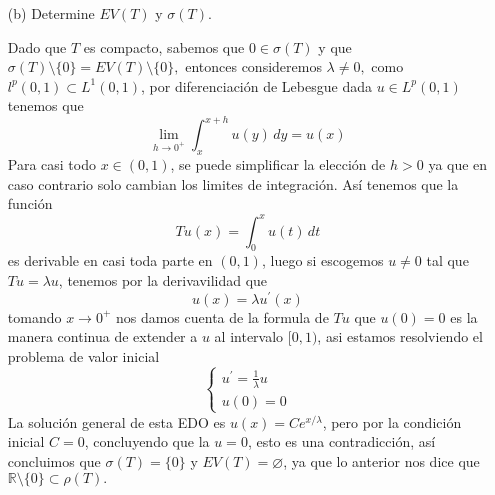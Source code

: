 \begin{itemize}
\begin{sproof}
    \end{sproof}
\item[(b)] Determine $E V(T)$ y $\sigma(T)$.
    \begin{sproof}
        Dado que $T$ es compacto, sabemos que $0\in \sigma(T)$ y que $\sigma(T)\setminus \{0\}=EV(T)\setminus\{0\},$ entonces consideremos $\lambda\neq 0,$ como $l^p(0,1)\subset L^1(0,1)$, por diferenciación  de Lebesgue dada $u\in L^p(0,1)$ tenemos que
        $$\lim_{h\to 0^+}\int_x^{x+h}u(y)\,dy=u(x)$$
        Para casi todo $x\in(0,1)$, se puede simplificar la elección de $h>0$ ya que en caso contrario solo cambian los limites de integración. Así tenemos que la función
        $$Tu(x)=\int_0^xu(t)\,dt$$
        es derivable en casi toda parte en $(0,1)$, luego si escogemos $u\neq 0$ tal que $Tu=\lambda u$, tenemos por la derivavilidad que
        $$u(x)=\lambda u^\prime(x)$$
        tomando $x\to 0^+$ nos damos cuenta de la formula de $Tu$ que $u(0)=0$ es la manera continua de extender a $u$ al intervalo $[0,1)$, asi estamos resolviendo el problema de valor inicial
        $$\begin{cases}
            u^\prime=\frac{1}{\lambda}u\\
            u(0)=0
        \end{cases}$$
        La solución general de esta EDO es $u(x)=Ce^{x/\lambda}$, pero por la condición inicial $C=0$, concluyendo que la $u=0$, esto es una contradicción, así concluimos que  $\sigma(T)=\{0\}$ y $EV(T)=\varnothing$, ya que lo anterior nos dice que $\mathbb{R}\setminus\{0\}\subset\rho(T).$


\end{sproof}
\end{itemize}
